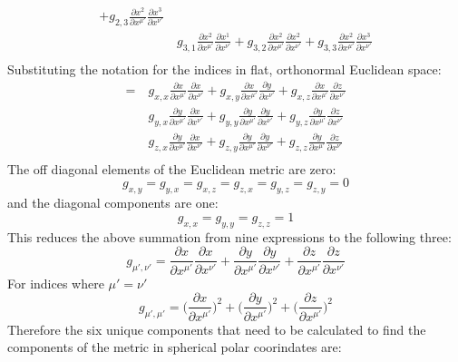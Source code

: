 \documentclass[9pt]{report}
\begin{document}
\begin{enumerate}
\begin{enumerate}
\[\begin{align*}
    +g_{2,3}\frac{\partial x^2}{\partial x^{\mu'}}\frac{\partial x^3}{\partial x^{\nu'}}\\
    &\
     g_{3,1}\frac{\partial x^2}{\partial x^{\mu'}}\frac{\partial x^1}{\partial x^{\nu'}}
    +g_{3,2}\frac{\partial x^2}{\partial x^{\mu'}}\frac{\partial x^2}{\partial x^{\nu'}}
    +g_{3,3}\frac{\partial x^2}{\partial x^{\mu'}}\frac{\partial x^3}{\partial x^{\nu'}}\\
    \end{align*}
  \]
  Substituting the notation for the indices in flat, orthonormal Euclidean
  space:
  \[
    \begin{align*}
    =&\
     g_{x,x}\frac{\partial x}{\partial x^{\mu'}}\frac{\partial x}{\partial x^{\nu'}}
    +g_{x,y}\frac{\partial x}{\partial x^{\mu'}}\frac{\partial y}{\partial x^{\nu'}}
    +g_{x,z}\frac{\partial x}{\partial x^{\mu'}}\frac{\partial z}{\partial x^{\nu'}}\\
    &\ g_{y,x}\frac{\partial y}{\partial x^{\mu'}}\frac{\partial x}{\partial x^{\nu'}}
    +g_{y,y}\frac{\partial y}{\partial x^{\mu'}}\frac{\partial y}{\partial x^{\nu'}}
    +g_{y,z}\frac{\partial y}{\partial x^{\mu'}}\frac{\partial z}{\partial x^{\nu'}}\\
    &\
     g_{z,x}\frac{\partial y}{\partial x^{\mu'}}\frac{\partial x}{\partial x^{\nu'}}
    +g_{z,y}\frac{\partial y}{\partial x^{\mu'}}\frac{\partial y}{\partial x^{\nu'}}
    +g_{z,z}\frac{\partial y}{\partial x^{\mu'}}\frac{\partial z}{\partial x^{\nu'}}\\
    \end{align*}
  \]
  The off diagonal elements of the Euclidean metric are zero:
  \[
    g_{x,y} = g_{y,x} = g_{x,z} = g_{z,x} = g_{y,z} = g_{z,y} = 0
  \]
  and the diagonal components are one:
  \[
    g_{x,x} = g_{y,y} = g_{z,z} = 1
  \]
  This reduces the above summation from nine expressions to the following three: \[
    g_{\mu',\nu'} =
    \frac{\partial x}{\partial x^{\mu'}} \frac{\partial x}{\partial x^{\nu'}} +
    \frac{\partial y}{\partial x^{\mu'}} \frac{\partial y}{\partial x^{\nu'}} +
    \frac{\partial z}{\partial x^{\mu'}} \frac{\partial z}{\partial x^{\nu'}}
  \]
  For indices where $\mu'=\nu'$
  \[
    g_{\mu', \mu'} =
    \Bigg( \frac{\partial x}{\partial x^{\mu'}}\Bigg)^2+
    \Bigg(\frac{\partial y}{\partial x^{\mu'}}\Bigg)^2+
    \Bigg(\frac{\partial z}{\partial x^{\mu'}}\Bigg)^2
  \]
  Therefore the six unique components that need to be calculated to find the
  components of the metric in spherical polar coorindates are:
  \[
    \begin{align*}

\end{align*}\]
\end{enumerate}
\end{enumerate}
\end{document}
